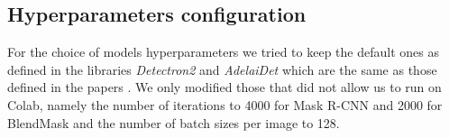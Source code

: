 \documentclass[10pt,twocolumn,letterpaper]{article}
\begin{document}
\subsection{Hyperparameters configuration}
For the choice of models hyperparameters we tried to keep the default ones as defined in the libraries \textit{Detectron2} and \textit{AdelaiDet} which are the same as those defined in the papers \cite{Authors1_maskrcnn, Authors2_BlendMask}. We only modified those that did not allow us to run on Colab, namely the number of iterations to 4000 for Mask R-CNN and 2000 for BlendMask and the number of batch sizes per image to 128.
\end{document}
